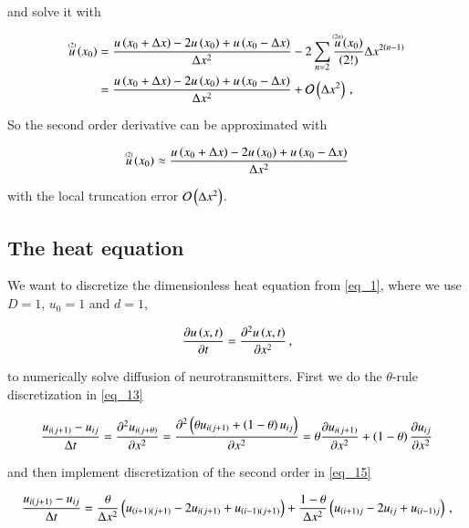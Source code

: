 \documentclass[11pt,english,a4paper]{article}
\begin{document}
\begin{flushleft}
and solve it with

\begin{align*}
\T{u}{(2)}\p{x_0} &= \frac{u\p{x_0+\Delta x} - 2 u\p{x_0} + u\p{x_0-\Delta x}}{\Delta x^2} - 2\sum_{n=2} \frac{\T{u}{(2n)}\p{x_0}}{(2!)}\Delta x^{2(n-1)}
\\ &=  \frac{u\p{x_0+\Delta x} - 2 u\p{x_0} + u\p{x_0-\Delta x}}{\Delta x^2} + \mathcal{O}\p{\Delta x^2}\,,
\end{align*}

So the second order derivative can be approximated with

\begin{align}
\T{u}{(2)}\p{x_0} \approx   \frac{u\p{x_0+\Delta x} - 2 u\p{x_0} + u\p{x_0-\Delta x}}{\Delta x^2}
\label{eq_15}
\end{align}

with the local truncation error $\mathcal{O}\p{\Delta x^2}$.

\subsection{The heat equation} \label{heat_equation}

We want to discretize the dimensionless heat equation from \eqref{eq_1}, where we use $D=1$, $u_0=1$ and $d=1$, 

\begin{align*}
\frac{\partial u\p{x,t}}{\partial t} = \frac{\partial^2 u\p{x,t}}{\partial x^2}\,,
\end{align*}

to numerically solve diffusion of neurotransmitters. First we do the $\theta$-rule discretization in \eqref{eq_13} 

\begin{align*}
\frac{u_{i(j+1)}-u_{ij}}{\Delta t} = \frac{\partial^2 u_{i(j+\theta)}}{\partial x^2} = \frac{\partial^2 \p{\theta u_{i(j+1)}+\p{1-\theta}u_{ij}}}{\partial x^2} = \theta \frac{\partial u_{i(j+1)}}{\partial x^2} + \p{1-\theta}\frac{\partial u_{ij}}{\partial x^2}
\end{align*}

and then implement discretization of the second order in \eqref{eq_15}

\begin{align}
\frac{u_{i(j+1)}-u_{ij}}{\Delta t} = \frac{\theta}{\Delta x^2}\p{u_{(i+1)(j+1)} - 2 u_{i(j+1)} + u_{(i-1)(j+1)}} + \frac{1-\theta}{\Delta x^2}\p{u_{(i+1)j} - 2u_{ij} +u_{(i-1)j}} \,,
\label{eq_16}
\end{align}


\end{flushleft}
\end{document}
